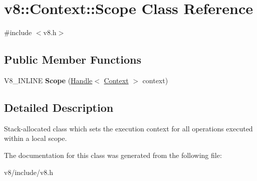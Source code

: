 \hypertarget{classv8_1_1Context_1_1Scope}{\section{v8\-:\-:Context\-:\-:Scope Class Reference}
\label{classv8_1_1Context_1_1Scope}
}


{\ttfamily \#include $<$v8.\-h$>$}

\subsection*{Public Member Functions}
\begin{DoxyCompactItemize}
\item 
\hypertarget{classv8_1_1Context_1_1Scope_a171c1cb92354b52c8b1764e88b9540c8}{V8\-\_\-\-I\-N\-L\-I\-N\-E {\bfseries Scope} (\hyperlink{classv8_1_1Handle}{Handle}$<$ \hyperlink{classv8_1_1Context}{Context} $>$ context)}\label{classv8_1_1Context_1_1Scope_a171c1cb92354b52c8b1764e88b9540c8}

\end{DoxyCompactItemize}


\subsection{Detailed Description}
Stack-\/allocated class which sets the execution context for all operations executed within a local scope. 

The documentation for this class was generated from the following file\-:\begin{DoxyCompactItemize}
\item 
v8/include/v8.\-h\end{DoxyCompactItemize}

